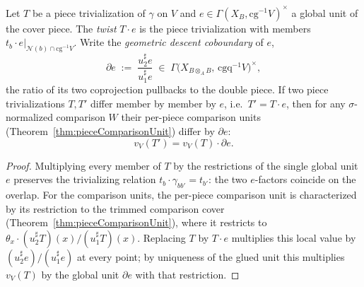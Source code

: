 \begin{theorem}
  \label{thm:pieceComparisonUnit_twist}
  \leanok
  Let \(T\) be a piece trivialization of \(\gamma\) on \(V\) and \(e \in \Gamma(X_B, \mathrm{cg}^{-1}
  V)^{\times}\) a global unit of the cover piece. The \emph{twist} \(T \cdot e\) is the piece
  trivialization with members \(t_b \cdot e|_{\mathcal N(b) \cap \mathrm{cg}^{-1}V}\). Write the
  \emph{geometric descent coboundary} of \(e\),
  \[
    \partial e \;:=\; \frac{u_2^{\sharp} e}{u_1^{\sharp} e} \;\in\; \Gamma\bigl(X_{B \otimes_A B},\,
      \mathrm{cgq}^{-1}V\bigr)^{\times},
  \]
  the ratio of its two coprojection pullbacks to the double piece. If two piece trivializations \(T,
  T'\) differ member by member by \(e\), i.e.\ \(T' = T \cdot e\), then for any \(\sigma\)-normalized
  comparison \(W\) their per-piece comparison units (Theorem~\ref{thm:pieceComparisonUnit}) differ by
  \(\partial e\):
  \[
    v_V(T') = v_V(T) \cdot \partial e .
  \]
\end{theorem}
\begin{proof}
  \leanok
  Multiplying every member of \(T\) by the restrictions of the single global unit \(e\) preserves the
  trivializing relation \(t_b \cdot \gamma_{b b'} = t_{b'}\): the two \(e\)-factors coincide on the
  overlap. For the comparison units, the per-piece comparison unit is characterized by its
  restriction to the trimmed comparison cover (Theorem~\ref{thm:pieceComparisonUnit}), where it
  restricts to \(\theta_x \cdot (u_2^{\sharp}T)(x) / (u_1^{\sharp}T)(x)\). Replacing \(T\) by \(T
  \cdot e\) multiplies this local value by \((u_2^{\sharp}e)/(u_1^{\sharp}e)\) at every point; by
  uniqueness of the glued unit this multiplies \(v_V(T)\) by the global unit \(\partial e\) with that
  restriction.
\end{proof}

